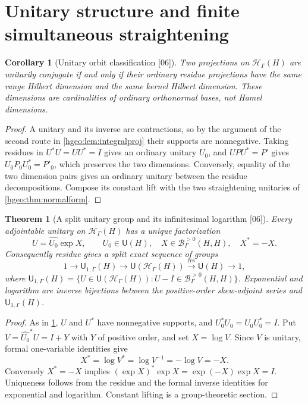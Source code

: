 \documentclass[11pt,letterpaper]{article}
\numberwithin{equation}{section}
\newtheorem{theorem}{Theorem}[section]
\newtheorem{corollary}[corollary]{Corollary}
\theoremstyle{definition}
\theoremstyle{remark}
\newcommand{\HH}[1]{\mathscr H_\Gamma(#1)}
\newcommand{\Bpos}[2]{\mathscr B^{>0}_\Gamma(#1,#2)}
\newcommand{\res}{\operatorname{res}}
\newcommand{\Un}{\mathsf U}
\newcommand{\src}[1]{\textup{\textsf{\small[#1]}}}
\begin{document}
\section{Unitary structure and finite simultaneous straightening}
\label{hgeo:sec:unitary}

\begin{corollary}[Unitary orbit classification \src{06}]\label{hgeo:cor:orbits}
Two projections on $\HH{H}$ are unitarily conjugate if and only if their
ordinary residue projections have the same range Hilbert dimension and the
same kernel Hilbert dimension. These dimensions are cardinalities of ordinary
orthonormal bases, not Hamel dimensions.
\end{corollary}
\begin{proof}
A unitary and its inverse are contractions, so by the argument of the second
route in \cref{hgeo:lem:integralproj} their supports are nonnegative. Taking
residues in $U^*U=UU^*=I$ gives an ordinary unitary $U_0$, and $UPU^*=P'$
gives $U_0P_0U_0^*=P'_0$, which preserves the two dimensions. Conversely,
equality of the two dimension pairs gives an ordinary unitary between the
residue decompositions. Compose its constant lift with the two straightening
unitaries of \cref{hgeo:thm:normalform}.
\end{proof}

\begin{theorem}[A split unitary group and its infinitesimal logarithm
\src{06}]\label{hgeo:thm:unitary}
Every adjointable unitary on $\HH{H}$ has a unique factorization
\[
 U=\widehat{U_0}\exp X,\qquad U_0\in\Un(H),\quad
 X\in\Bpos{H}{H},\quad X^*=-X.
\]
Consequently residue gives a split exact sequence of groups
\[
 1\longrightarrow\Un_{1,\Gamma}(H)
 \longrightarrow\Un(\HH{H})
 \overset{\res}{\longrightarrow}\Un(H)\longrightarrow1,
\]
where $\Un_{1,\Gamma}(H)=\{U\in\Un(\HH H):U-I\in\Bpos{H}{H}\}$. Exponential
and logarithm are inverse bijections between the positive-order skew-adjoint
series and $\Un_{1,\Gamma}(H)$.
\end{theorem}
\begin{proof}
As in \cref{hgeo:cor:orbits}, $U$ and $U^*$ have nonnegative supports, and
$U_0^*U_0=U_0U_0^*=I$. Put $V=\widehat{U_0}^*U=I+Y$ with $Y$ of positive
order, and set $X=\log V$. Since $V$ is unitary, formal one-variable
identities give
\[
 X^*=\log V^*=\log V^{-1}=-\log V=-X.
\]
Conversely $X^*=-X$ implies $(\exp X)^*\exp X=\exp(-X)\exp X=I$.
Uniqueness follows from the residue and the formal inverse identities for
exponential and logarithm. Constant lifting is a group-theoretic section.
\end{proof}
\end{document}
